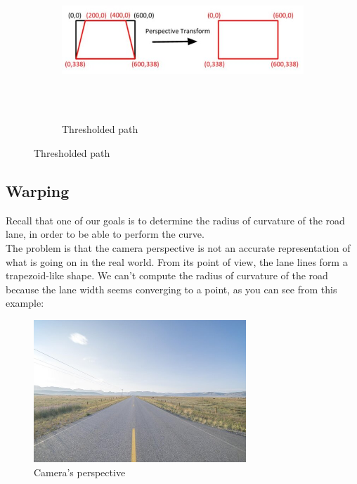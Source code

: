 \documentclass[12pt,a4paper]{article}
\begin{document}
\begin{large}
\begin{figure} [!htb]
\begin{subfigure}[b]{0.4\textwidth}
    \end{subfigure}
    \hspace{1cm}
    \begin{subfigure}[b]{0.4\textwidth}
    \centering
    \captionsetup{justification=centering}
      \includegraphics[width=\textwidth, height = 6cm]{images/perspective_transform.jpg}
      \caption{Thresholded path \\}
      
    \end{subfigure}
  \end{figure}

\subsection{Warping}
Recall that one of our goals is to determine the radius of curvature of the road lane, in order to be able to perform the curve. \\
The problem is that the camera perspective is not an accurate representation of what is going on in the real world. From its point of view, the lane lines form a trapezoid-like shape. We can't compute the radius of curvature of the road because the lane width seems converging to a point, as you can see from this example:\\

\begin{figure} [!htb]
\centering
\captionsetup{justification=centering}
\includegraphics[width=8cm]{images/road_endless_straight_vanishing.jpg}
\caption{Camera's perspective}
\end{figure}


\end{large}
\end{document}
